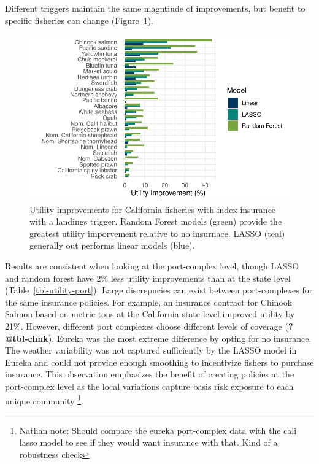 \documentclass[
  letterpaper,
  DIV=11,
  numbers=noendperiod]{scrartcl}
\begin{document}
Different triggers maintain the same magntiude of improvements, but
benefit to specific fisheries can change (Figure~\ref{fig-cali-mt}).

\begin{figure}

{\centering \includegraphics{ibi-ml_files/figure-pdf/fig-cali-mt-1.pdf}

}

\caption{\label{fig-cali-mt}Utility improvements for California
fisheries with index insurance with a landings trigger. Random Forest
models (green) provide the greatest utility imporvement relative to no
insurnace. LASSO (teal) generally out performs linear models (blue).}

\end{figure}

Results are consistent when looking at the port-complex level, though
LASSO and random forest have 2\% less utility improvements than at the
state level (Table~\ref{tbl-utility-port}). Large discrepncies can exist
between port-complexes for the same insurance policies. For example, an
insurance contract for Chinook Salmon based on metric tons at the
California state level improved utility by 21\%. However, different port
complexes choose different levels of coverage (\textbf{?@tbl-chnk}).
Eureka was the most extreme difference by opting for no insurance. The
weather variability was not captured sufficiently by the LASSO model in
Eureka and could not provide enough smoothing to incentivize fishers to
purchase insurance. This observation emphasizes the benefit of creating
policies at the port-complex level as the local variations capture basis
risk exposure to each unique community \footnote{Nathan note: Should
  compare the eureka port-complex data with the cali lasso model to see
  if they would want insurance with that. Kind of a robustness check}.
\end{document}
